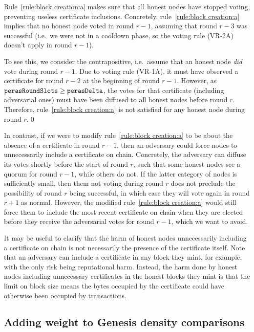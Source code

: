 Rule~\ref{rule:block creation:a} makes sure that all honest nodes have stopped voting, preventing useless certificate inclusions.
Concretely, rule~\ref{rule:block creation:a} implies that no honest node voted in round $r-1$, assuming that round $r-3$ was successful (i.e.\ we were not in a cooldown phase, so the voting rule (VR-2A) doesn't apply in round $r-1$).

To see this, we consider the contrapositive, i.e.\ assume that an honest node \emph{did} vote during round $r-1$.
Due to voting rule (VR-1A), it must have observed a certificate for round $r-2$ at the beginning of round $r-1$.
However, as $\mathtt{perasRoundSlots}\ge\mathtt{perasDelta}$, the votes for that certificate (including adversarial ones) must have been diffused to all honest nodes before round $r$.
Therefore, rule~\ref{rule:block creation:a} is not satisfied for any honest node during round $r$.\qed{}

In contrast, if we were to modify rule~\ref{rule:block creation:a} to be about the absence of a certificate in round $r-1$, then an adversary could force nodes to unnecessarily include a certificate on chain.
Concretely, the adversary can diffuse its votes shortly before the start of round $r$, such that some honest nodes see a quorum for round $r-1$, while others do not.
If the latter category of nodes is sufficiently small, then them not voting during round $r$ does not preclude the possibility of round $r$ being successful, in which case they will vote again in round $r + 1$ as normal.
However, the modified rule~\ref{rule:block creation:a} would still force them to include the most recent certificate on chain when they are elected before they receive the adversarial votes for round $r-1$, which we want to avoid.

It may be useful to clarify that the harm of honest nodes unnecessarily including a certificate on chain is not necessarily the presence of the certificate itself.
Note that an adversary can include a certificate in any block they mint, for example, with the only risk being reputational harm.
Instead, the harm done by honest nodes including unnecessary certificates in the honest blocks they mint is that the limit on block size means the bytes occupied by the certificate could have otherwise been occupied by transactions.

\subsection{Adding weight to Genesis density comparisons}\label{sec:weighted genesis}

